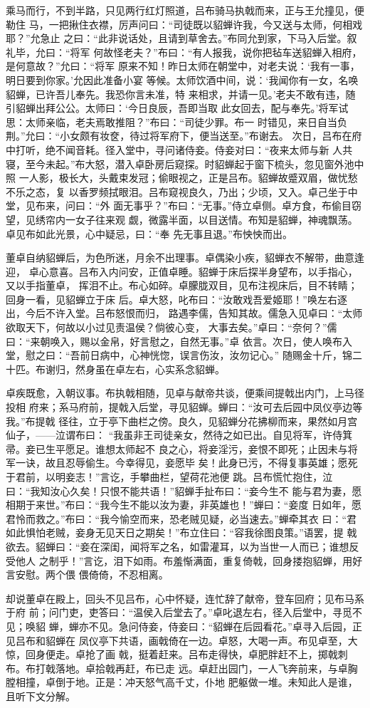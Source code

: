乘马而行，不到半路，只见两行红灯照道，吕布骑马执戟而来，正与王允撞见，便勒住
马，一把揪住衣襟，厉声问曰：“司徒既以貂蝉许我，今又送与太师，何相戏耶？”允急止
之曰：“此非说话处，且请到草舍去。”布同允到家，下马入后堂。叙礼毕，允曰：“将军
何故怪老夫？”布曰：“有人报我，说你把毡车送貂蝉入相府，是何意故？”允曰：“将军
原来不知！昨日太师在朝堂中，对老夫说：‘我有一事，明日要到你家。’允因此准备小宴
等候。太师饮酒中间，说：‘我闻你有一女，名唤貂蝉，已许吾儿奉先。我恐你言未准，特
来相求，并请一见。’老夫不敢有违，随引貂蝉出拜公公。太师曰：‘今日良辰，吾即当取
此女回去，配与奉先。’将军试思：太师亲临，老夫焉敢推阻？”布曰：“司徒少罪。布一
时错见，来日自当负荆。”允曰：“小女颇有妆奁，待过将军府下，便当送至。”布谢去。
次日，吕布在府中打听，绝不闻音耗。径入堂中，寻问诸侍妾。侍妾对曰：“夜来太师与新
人共寝，至今未起。”布大怒，潜入卓卧房后窥探。时貂蝉起于窗下梳头，忽见窗外池中照
一人影，极长大，头戴束发冠；偷眼视之，正是吕布。貂蝉故蹙双眉，做忧愁不乐之态，复
以香罗频拭眼泪。吕布窥视良久，乃出；少顷，又入。卓己坐于中堂，见布来，问曰：“外
面无事乎？”布曰：“无事。”侍立卓侧。卓方食，布偷目窃望，见绣帘内一女子往来观
觑，微露半面，以目送情。布知是貂蝉，神魂飘荡。卓见布如此光景，心中疑忌，曰：“奉
先无事且退。”布怏怏而出。

董卓自纳貂蝉后，为色所迷，月余不出理事。卓偶染小疾，貂蝉衣不解带，曲意逢迎，
卓心意喜。吕布入内问安，正值卓睡。貂蝉于床后探半身望布，以手指心，又以手指董卓，
挥泪不止。布心如碎。卓朦胧双目，见布注视床后，目不转睛；回身一看，见貂蝉立于床
后。卓大怒，叱布曰：“汝敢戏吾爱姬耶！”唤左右逐出，今后不许入堂。吕布怒恨而归，
路遇李儒，告知其故。儒急入见卓曰：“太师欲取天下，何故以小过见责温侯？倘彼心变，
大事去矣。”卓曰：“奈何？”儒曰：“来朝唤入，赐以金帛，好言慰之，自然无事。”卓
依言。次日，使人唤布入堂，慰之曰：“吾前日病中，心神恍惚，误言伤汝，汝勿记心。”
随赐金十斤，锦二十匹。布谢归，然身虽在卓左右，心实系念貂蝉。

卓疾既愈，入朝议事。布执戟相随，见卓与献帝共谈，便乘间提戟出内门，上马径投相
府来；系马府前，提戟入后堂，寻见貂蝉。蝉曰：“汝可去后园中凤仪亭边等我。”布提戟
径往，立于亭下曲栏之傍。良久，见貂蝉分花拂柳而来，果然如月宫仙子，——泣谓布曰：
“我虽非王司徒亲女，然待之如已出。自见将军，许侍箕帚。妾已生平愿足。谁想太师起不
良之心，将妾淫污，妾恨不即死；止因未与将军一诀，故且忍辱偷生。今幸得见，妾愿毕
矣！此身已污，不得复事英雄；愿死于君前，以明妾志！”言讫，手攀曲栏，望荷花池便
跳。吕布慌忙抱住，泣曰：“我知汝心久矣！只恨不能共语！”貂蝉手扯布曰：“妾今生不
能与君为妻，愿相期于来世。”布曰：“我今生不能以汝为妻，非英雄也！”蝉曰：“妾度
日如年，愿君怜而救之。”布曰：“我今愉空而来，恐老贼见疑，必当速去。”蝉牵其衣
曰：“君如此惧怕老贼，妾身无见天日之期矣！”布立住曰：“容我徐图良策。”语罢，提
戟欲去。貂蝉曰：“妾在深闺，闻将军之名，如雷灌耳，以为当世一人而已；谁想反受他人
之制乎！”言讫，泪下如雨。布羞惭满面，重复倚戟，回身搂抱貂蝉，用好言安慰。两个偎
偎倚倚，不忍相离。

却说董卓在殿上，回头不见吕布，心中怀疑，连忙辞了献帝，登车回府；见布马系于府
前；问门吏，吏答曰：“温侯入后堂去了。”卓叱退左右，径入后堂中，寻觅不见；唤貂
蝉，蝉亦不见。急问侍妾，侍妾曰：“貂蝉在后园看花。”卓寻入后园，正见吕布和貂蝉在
凤仪亭下共语，画戟倚在一边。卓怒，大喝一声。布见卓至，大惊，回身便走。卓抢了画
戟，挺着赶来。吕布走得快，卓肥胖赶不上，掷戟刺布。布打戟落地。卓拾戟再赶，布已走
远。卓赶出园门，一人飞奔前来，与卓胸膛相撞，卓倒于地。正是：冲天怒气高千丈，仆地
肥躯做一堆。未知此人是谁，且听下文分解。